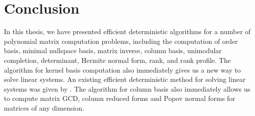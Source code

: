 
\chapter{Conclusion\label{sec:Future-Research}}

In this thesis, we have presented efficient deterministic algorithms
for a number of polynomial matrix computation problems, including
the computation of order basis, minimal nullspace basis, matrix inverse,
column basis, unimodular completion, determinant, Hermite normal form,
rank, and rank profile. The algorithm for kernel basis computation
also immediately gives us a new way to solve linear systems. An existing
efficient deterministic method for solving linear systems was given
by \citet{GSSV2012}. The algorithm for column basis also immediately
allows us to compute matrix GCD, column reduced forms and Popov normal
forms for matrices of any dimension. 

